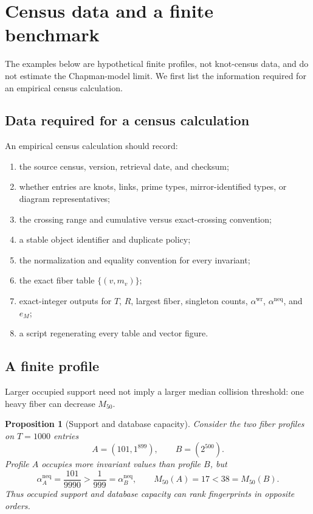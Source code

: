 \documentclass[9pt,twoside]{pnas-new}
\newtheorem{proposition}[theorem]{Proposition}
\theoremstyle{definition}
\theoremstyle{remark}
\newcommand{\neqp}{\mathrm{neq}}
\newcommand{\wrp}{\mathrm{wr}}
\begin{document}
\section{Census data and a finite benchmark}
\label{si:census-computations}
The examples below are hypothetical finite profiles, not knot-census data, and do not estimate the Chapman-model limit.  We first list the information required for an empirical census calculation.

\subsection{Data required for a census calculation}
An empirical census calculation should record:
\begin{enumerate}[label=(\roman*)]
 \item the source census, version, retrieval date, and checksum;
 \item whether entries are knots, links, prime types, mirror-identified types, or diagram representatives;
 \item the crossing range and cumulative versus exact-crossing convention;
 \item a stable object identifier and duplicate policy;
 \item the normalization and equality convention for every invariant;
 \item the exact fiber table $\{(v,m_v)\}$;
 \item exact-integer outputs for $T$, $R$, largest fiber, singleton counts, $\alpha^{\wrp}$, $\alpha^{\neqp}$, and $e_M$;
 \item a script regenerating every table and vector figure.
\end{enumerate}

\subsection{A finite profile}
Larger occupied support need not imply a larger median collision threshold: one heavy fiber can decrease $M_{50}$.
\begin{proposition}[Support and database capacity]
\label{prop:si-finite-benchmark}
Consider the two fiber profiles on $T=1000$ entries
\[
 A=(101,1^{899}),
 \qquad
 B=(2^{500}).
\]
Profile $A$ occupies more invariant values than profile $B$, but
\[
 \alpha_A^{\neqp}=\frac{101}{9990}>\frac1{999}=\alpha_B^{\neqp},
 \qquad
 M_{50}(A)=17<38=M_{50}(B).
\]
Thus occupied support and database capacity can rank fingerprints in opposite orders.
\end{proposition}
\end{document}
